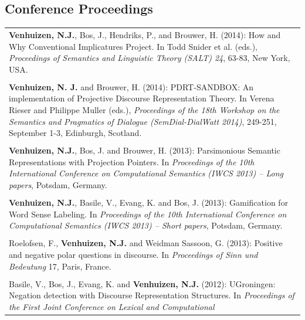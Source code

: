 \documentclass[a4paper,10pt]{article}
\begin{document}

\subsection*{Conference Proceedings}

\noindent
\begin{tabularx}{\textwidth}{ X }

    \textbf{Venhuizen, N.J.}, Bos, J., Hendriks, P., and Brouwer, H. (2014):
    How and Why Conventional Implicatures Project. In Todd Snider et al.
    (eds.), \textit{Proceedings of Semantics and Linguistic Theory (SALT) 24},
    63-83, New York, USA.\\
    \\
    \textbf{Venhuizen, N. J.} and Brouwer, H. (2014): PDRT-SANDBOX: An implementation
    of Projective Discourse Representation Theory. In Verena Rieser and
    Philippe Muller (eds.), \textit{Proceedings of the 18th Workshop on the
    Semantics and Pragmatics of Dialogue (SemDial-DialWatt 2014)}, 249-251,
    September 1-3, Edinburgh, Scotland.\\
    \\
    \textbf{Venhuizen, N.J.}, Bos, J. and Brouwer, H. (2013): Parsimonious 
    Semantic Representations with Projection Pointers. In \textit{Proceedings
    of the 10th International Conference on Computational Semantics (IWCS 2013)
    -- Long papers}, Potsdam, Germany.\\
    \\
    \textbf{Venhuizen, N.J.}, Basile, V., Evang, K. and Bos, J. (2013):
    Gamification for Word Sense Labeling. In \textit{Proceedings of the 10th 
    International Conference on Computational Semantics (IWCS 2013) --
    Short papers}, Potsdam, Germany.\\
    \\
    Roelofsen, F., \textbf{Venhuizen, N.J.} and Weidman Sassoon, G. (2013):
    Positive and negative polar questions in discourse. In \textit{Proceedings of
    Sinn und Bedeutung} 17, Paris, France.\\
    \\
    Basile, V., Bos, J., Evang, K. and \textbf{Venhuizen, N.J.} (2012): UGroningen:
    Negation detection with Discourse Representation Structures. In
    \textit{Proceedings of the First Joint Conference on Lexical and Computational
}
\end{tabularx}
\end{document}
